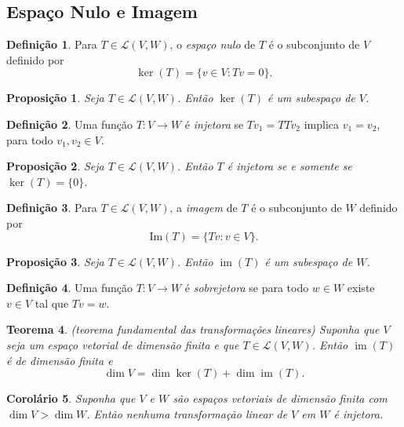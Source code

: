 \documentclass[12pt]{article}
\theoremstyle{plain}
\newtheorem{thm}{Teorema}[section]
\newtheorem{prop}[thm]{Proposição}
\newtheorem{cor}[thm]{Corolário}
\theoremstyle{definition}
\newtheorem{defn}{Definição}[section]
\theoremstyle{remark}
\DeclareMathOperator{\im}{im}
\begin{document}
\subsection{Espaço Nulo e Imagem}
\begin{defn}
    Para \(T \in \mathcal{L}(V, W)\), o \emph{espaço nulo} de \(T\) é o subconjunto de \(V\) definido por
    \[
        \ker(T) = \{v \in V : Tv = 0\}.
    \]
\end{defn}

\begin{prop}
    Seja \(T \in \mathcal{L}(V, W)\). Então \(\ker(T)\) é um subespaço de \(V\).
\end{prop}

\begin{defn}
    Uma função \(T: V \to W\) é \emph{injetora} se \(Tv_1 = TTv_2\) implica \(v_1 = v_2\), para todo \(v_1, v_2 \in V\).
\end{defn}

\begin{prop}
    Seja \(T \in \mathcal{L}(V, W)\). Então \(T\) é injetora se e somente se \(\ker(T) = \{0\}\).
\end{prop}

\begin{defn}
    Para \(T \in \mathcal{L}(V, W)\), a \emph{imagem} de \(T\) é o subconjunto de \(W\) definido por
    \[
        \text{Im}(T) = \{Tv : v \in V\}.
    \]
\end{defn}

\begin{prop}
    Seja \(T \in \mathcal{L}(V, W)\). Então \(\im(T)\) é um subespaço de \(W\).
\end{prop}

\begin{defn}
    Uma função \(T: V \to W\) é \emph{sobrejetora} se para todo \(w \in W\) existe \(v \in V\) tal que \(Tv = w\).
\end{defn}

\begin{thm} (teorema fundamental das transformações lineares)
    Suponha que \(V\) seja um espaço vetorial de dimensão finita e que \(T \in \mathcal{L}(V, W)\). Então \(\im(T)\) é de dimensão finita e
    \begin{equation}
        \dim V = \dim \ker(T) + \dim \im(T).
    \end{equation}
\end{thm}

\begin{cor}
    Suponha que \(V\) e \(W\) são espaços vetoriais de dimensão finita com \(\dim V > \dim W\). Então nenhuma transformação linear de \(V\) em \(W\) é injetora.
\end{cor}
\end{document}
